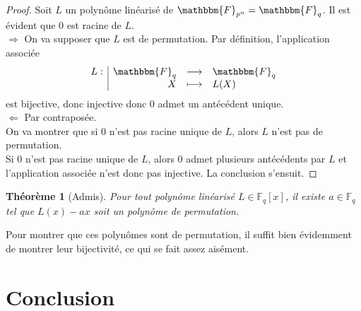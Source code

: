 \documentclass[12pt]{article}
\newcommand{\Fq}{\mathbbm{F}_q}
\newcommand{\fonction}[5]{
\begin{displaymath}
\begin{array}{l|rcl}
\displaystyle
#1 : & #2 & \longrightarrow & #3 \\
    & #4 & \longmapsto & #5
\end{array}
\end{displaymath}
}
\newtheorem{theorem}{Théorème}
\theoremstyle{definition}
\begin{document}
\begin{proof}
Soit $L$ un polynôme linéarisé de $\mathbbm{F}_{p^n} = \Fq$. Il est évident que $0$ est racine de $L$.\\
$\Rightarrow$ On va supposer que $L$ est de permutation. Par définition, l'application associée \fonction{L}{\Fq}{\Fq}{X}{L(X)} est bijective, donc injective donc $0$ admet un antécédent unique.\\

$\Leftarrow$ Par contraposée.\\
On va montrer que si $0$ n'est pas racine unique de $L$, alors $L$ n'est pas de permutation.\\
Si $0$ n'est pas racine unique de $L$, alors $0$ admet plusieurs antécédents par $L$ et l'application associée n'est donc pas injective. La conclusion s'ensuit.
\end{proof}

\begin{theorem}[Admis]
Pour tout polynôme linéarisé $L \in \mathbb{F}_q[x]$, il existe $a \in \mathbb{F}_q$ tel que $L(x) - ax$ soit un polynôme de permutation.
\end{theorem}

Pour montrer que ces polynômes sont de permutation, il suffit bien évidemment de montrer leur bijectivité, ce qui se fait assez aisément.


\pagebreak

\section*{Conclusion}
\end{document}
